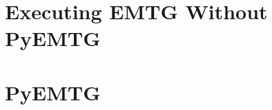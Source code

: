 \documentclass[11pt]{article}
\begin{document}


\section{Executing EMTG Without PyEMTG}
\label{sec:executing_emtg_without_pyemtg}




\section{PyEMTG}
\label{sec:pyemtg_look_elsewhere}


\end{document}
